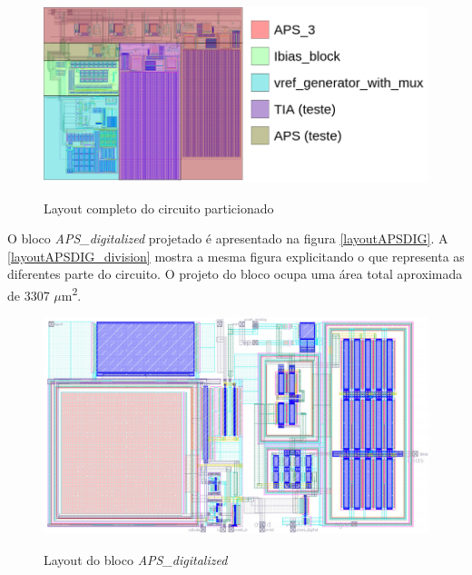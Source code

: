 \begin{figure}[!h]
 \centering
    \caption{Layout completo do circuito particionado} 
    \includegraphics[scale=0.4]{Projeto/Layout/Imagens/Image_CircuitoCompleto.png}
    \label{layoutcompleto_division}
\end{figure}

O bloco \textit{APS\_digitalized} projetado é apresentado na figura \autoref{layoutAPSDIG}. A \autoref{layoutAPSDIG_division} mostra a mesma figura explicitando o que representa as diferentes parte do circuito. O projeto do bloco ocupa uma área total aproximada de 3307 $\mu$m\textsuperscript{2}.

\begin{figure}[!h]
 \centering
    \centering
    \caption{Layout do bloco \textit{APS\_digitalized}} 
    \includegraphics[scale=0.8]{Projeto/Layout/Imagens/APS_DIGITALIZED.png}
    \label{layoutAPSDIG}
\end{figure}

